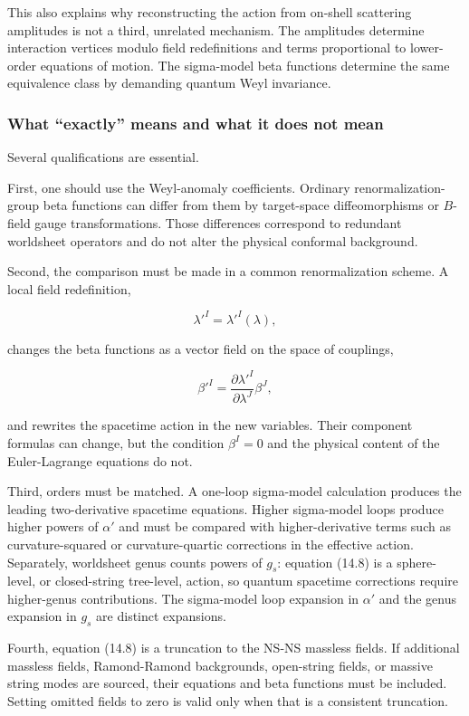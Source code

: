 \documentclass[
  10pt,
  a4paper,
  openany]{book}
\begin{document}
This also explains why reconstructing the action from on-shell
scattering amplitudes is not a third, unrelated mechanism. The
amplitudes determine interaction vertices modulo field redefinitions and
terms proportional to lower-order equations of motion. The sigma-model
beta functions determine the same equivalence class by demanding quantum
Weyl invariance.

\subsubsection{What ``exactly'' means and what it does not
mean}\label{what-exactly-means-and-what-it-does-not-mean}

Several qualifications are essential.

First, one should use the Weyl-anomaly coefficients. Ordinary
renormalization-group beta functions can differ from them by
target-space diffeomorphisms or \(B\)-field gauge transformations. Those
differences correspond to redundant worldsheet operators and do not
alter the physical conformal background.

Second, the comparison must be made in a common renormalization scheme.
A local field redefinition,

\[
\lambda'^I=\lambda'^I(\lambda),
\]

changes the beta functions as a vector field on the space of couplings,

\[
\beta'^I
=\frac{\partial\lambda'^I}{\partial\lambda^J}\beta^J,
\]

and rewrites the spacetime action in the new variables. Their component
formulas can change, but the condition \(\beta^I=0\) and the physical
content of the Euler-Lagrange equations do not.

Third, orders must be matched. A one-loop sigma-model calculation
produces the leading two-derivative spacetime equations. Higher
sigma-model loops produce higher powers of \(\alpha'\) and must be
compared with higher-derivative terms such as curvature-squared or
curvature-quartic corrections in the effective action. Separately,
worldsheet genus counts powers of \(g_s\): equation (14.8) is a
sphere-level, or closed-string tree-level, action, so quantum spacetime
corrections require higher-genus contributions. The sigma-model loop
expansion in \(\alpha'\) and the genus expansion in \(g_s\) are distinct
expansions.

Fourth, equation (14.8) is a truncation to the NS-NS massless fields. If
additional massless fields, Ramond-Ramond backgrounds, open-string
fields, or massive string modes are sourced, their equations and beta
functions must be included. Setting omitted fields to zero is valid only
when that is a consistent truncation.
\end{document}
